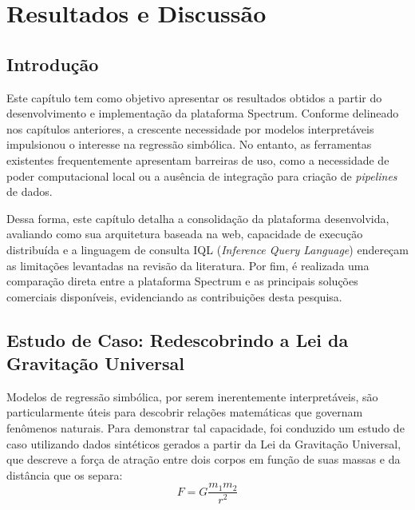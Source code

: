 \chapter{Resultados e Discussão}
\label{ch:results}

\section{Introdução}
\label{sec:results_intro}
Este capítulo tem como objetivo apresentar os resultados obtidos a partir do desenvolvimento e implementação da plataforma Spectrum. Conforme delineado nos capítulos anteriores, a crescente necessidade por modelos interpretáveis impulsionou o interesse na regressão simbólica. No entanto, as ferramentas existentes frequentemente apresentam barreiras de uso, como a necessidade de poder computacional local ou a ausência de integração para criação de \textit{pipelines} de dados.

Dessa forma, este capítulo detalha a consolidação da plataforma desenvolvida, avaliando como sua arquitetura baseada na web, capacidade de execução distribuída e a linguagem de consulta IQL (\textit{Inference Query Language}) endereçam as limitações levantadas na revisão da literatura. Por fim, é realizada uma comparação direta entre a plataforma Spectrum e as principais soluções comerciais disponíveis, evidenciando as contribuições desta pesquisa.

\section{Estudo de Caso: Redescobrindo a Lei da Gravitação Universal}
\label{sec:results_case_study}
Modelos de regressão simbólica, por serem inerentemente interpretáveis, são particularmente úteis para descobrir relações matemáticas que governam fenômenos naturais. Para demonstrar tal capacidade, foi conduzido um estudo de caso utilizando dados sintéticos gerados a partir da Lei da Gravitação Universal, que descreve a força de atração entre dois corpos em função de suas massas e da distância que os separa:
\begin{equation}
    F = G \frac{m_1 m_2}{r^2}
\end{equation}

